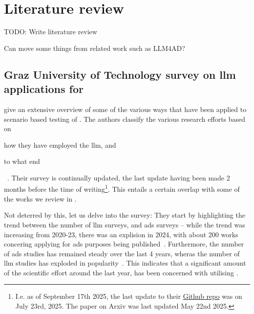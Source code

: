 \chapter{Literature review}

TODO: Write literature review

Can move some things from related work such as LLM4AD?

\section{Graz University of Technology survey on \acrshort{llm} applications for
} %

\citeauthor{surveyLLMScenarioBasedTesting} give an extensive overview of some of the various ways
that  have been applied to scenario based testing of .
The authors classify the various research efforts based on \begin{inparaenum}
    \item how they have employed the \acrshort{llm}, and
    \item to what end
\end{inparaenum}~\cite{surveyLLMScenarioBasedTesting}.
Their survey is continually updated, the last update having been made 2 months before the time of
writing\footnote{I.e. as of September 17th 2025, the last update to their
    \href{https://github.com/ftgTUGraz/LLM4ADSTest}{Github repo} was on July 23rd, 2025. The paper on
    Arxiv was last updated May 22nd 2025.}. This entails a certain overlap with some of the works we
review in .

Not deterred by this, let us delve into the survey:
They start by highlighting the trend between the number of \acrshort{llm} surveys, and
\acrshort{ads} surveys -- while the trend was increasing from 2020-23, there was an explision in
\num{2024}, with about \num{200} works concering applying  for \acrlong{ads}
purposes being published~\cite[p. 1, figure (b)]{surveyLLMScenarioBasedTesting}. Furthermore, the
number of \acrshort{ads} studies has remained steady over the last \num{4}  years, wheras the number
of \acrshort{llm} studies has exploded in popularity~\cite[p. 1, figure
    (a)]{surveyLLMScenarioBasedTesting}. This indicates that a significant amount of the scientific
effort around  the last year, has been concerned with utilising .

